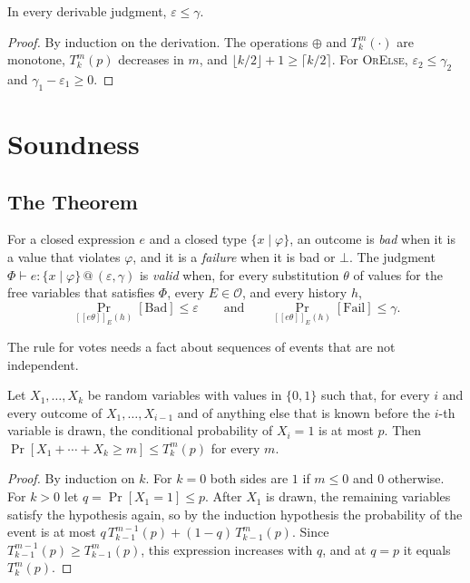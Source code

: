 \documentclass[acmsmall,nonacm,screen]{acmart}
\makeatletter
\newcommand{\rty}[2]{\{#1 \mid #2\}}
\newcommand{\at}[2]{\mathrel{@}(#1, #2)}
\newcommand{\sem}[1]{[\![#1]\!]}
\newcommand{\Bad}{\mathrm{Bad}}
\newcommand{\Fail}{\mathrm{Fail}}
\newcommand{\cO}{\mathcal{O}}
\newcommand{\tl}[3]{T_{#1}^{#2}(#3)}
\makeatother
\begin{document}
\begin{lemma}
\label{lem:grades}
In every derivable judgment, $\varepsilon \le \gamma$.
\end{lemma}

\begin{proof}
By induction on the derivation. The operations $\oplus$ and $\tl{k}{m}{\cdot}$ are monotone,
$\tl{k}{m}{p}$ decreases in $m$, and $\lfloor k/2 \rfloor + 1 \ge \lceil k/2 \rceil$. For
\textsc{OrElse}, $\varepsilon_2 \le \gamma_2$ and $\gamma_1 - \varepsilon_1 \ge 0$.
\end{proof}

\section{Soundness}
\label{sec:soundness}

\subsection{The Theorem}

For a closed expression $e$ and a closed type $\rty{x}{\varphi}$, an outcome is \emph{bad}
when it is a value that violates $\varphi$, and it is a \emph{failure} when it is bad or
$\bot$. The judgment $\Phi \vdash e : \rty{x}{\varphi} \at{\varepsilon}{\gamma}$ is
\emph{valid} when, for every substitution $\theta$ of values for the free variables that
satisfies $\Phi$, every $E \in \cO$, and every history $h$,
\[
\Pr_{\sem{e\theta}_E(h)}[\Bad] \le \varepsilon
\qquad\text{and}\qquad
\Pr_{\sem{e\theta}_E(h)}[\Fail] \le \gamma .
\]

The rule for votes needs a fact about sequences of events that are not independent.

\begin{lemma}[Domination]
\label{lem:dom}
Let $X_1, \ldots, X_k$ be random variables with values in $\{0, 1\}$ such that, for every $i$
and every outcome of $X_1, \ldots, X_{i-1}$ and of anything else that is known before the
$i$-th variable is drawn, the conditional probability of $X_i = 1$ is at most $p$. Then
$\Pr[X_1 + \cdots + X_k \ge m] \le \tl{k}{m}{p}$ for every $m$.
\end{lemma}

\begin{proof}
By induction on $k$. For $k = 0$ both sides are $1$ if $m \le 0$ and $0$ otherwise. For
$k > 0$ let $q = \Pr[X_1 = 1] \le p$. After $X_1$ is drawn, the remaining variables satisfy
the hypothesis again, so by the induction hypothesis the probability of the event is at most
$q\,\tl{k-1}{m-1}{p} + (1 - q)\,\tl{k-1}{m}{p}$. Since
$\tl{k-1}{m-1}{p} \ge \tl{k-1}{m}{p}$, this expression increases with $q$, and at $q = p$ it
equals $\tl{k}{m}{p}$.
\end{proof}
\end{document}
